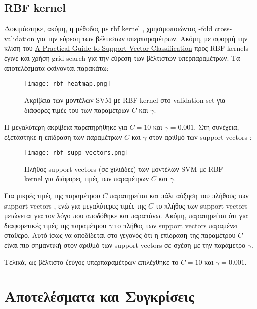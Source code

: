 \documentclass[a4paper,12pt]{article}
\newcommand{\lt}{\latintext}
\newcommand{\gt}{\greektext}
\begin{document}
\subsection{\lt RBF kernel \gt}

Δοκιμάστηκε, ακόμη, η μέθοδος με \lt rbf kernel \gt, χρησιμοποιώντας \lt 3-fold cross-validation \gt για την εύρεση των βέλτιστων υπερπαραμέτρων. Ακόμη, με αφορμή 
την κλίση του \lt \href{https://www.csie.ntu.edu.tw/~cjlin/papers/guide/guide.pdf}{A Practical Guide to Support Vector Classification} \gt προς \lt RBF kernels \gt έγινε και χρήση \lt grid search \gt 
για την εύρεση των βέλτιστων υπερπαραμέτρων. Τα αποτελέσματα φαίνονται παρακάτω:

\begin{figure}[H]
    \centering
    \texttt{[image: rbf\_heatmap.png]}
    \caption{Ακρίβεια των μοντέλων \lt SVM \gt με \lt RBF kernel \gt στο \lt validation set \gt για διάφορες τιμές του των παραμέτρων $C$ και $\gamma$.}
    \label{fig:rbf_heatmap}
\end{figure}

Η μεγαλύτερη ακρίβεια παρατηρήθηκε για $C=10$ και $\gamma=0.001$. Στη συνέχεια, εξετάστηκε η επίδραση των παραμέτρων $C$ και $\gamma$ στον αριθμό των \lt support vectors \gt :

\begin{figure}[H]
    \centering
    \texttt{[image: rbf supp vectors.png]}
    \caption{Πλήθος \lt support vectors \gt (σε χιλιάδες) των μοντέλων \lt SVM \gt με \lt RBF kernel \gt για διάφορες τιμές των παραμέτρων $C$ και $\gamma$.}
    \label{fig:rbf supp vectors}
\end{figure}

Για μικρές τιμές της παραμέτρου $C$ παρατηρείται και πάλι αύξηση του πλήθους των \lt support vectors \gt, 
ενώ για μεγαλύτερες τιμές της $C$ το πλήθος των \lt support vectors \gt μειώνεται για τον λόγο που αποδόθηκε και παραπάνω. Ακόμη, παρατηρείται ότι για διαφορετικές τιμές της παραμέτρου $\gamma$
το πλήθος των \lt support vectors \gt παραμένει σταθερό. Αυτό ίσως να αποδίδεται στο γεγονός ότι η επίδραση της παραμέτρου $C$ είναι πιο σημαντική στον αριθμό των \lt support vectors \gt σε σχέση με την παράμετρο $\gamma$.

Τελικά, ως βέλτιστο ζεύγος υπερπαραμέτρων επιλέχθηκε το $C=10$ και $\gamma=0.001$.





\section{Αποτελέσματα και Συγκρίσεις}
\end{document}
